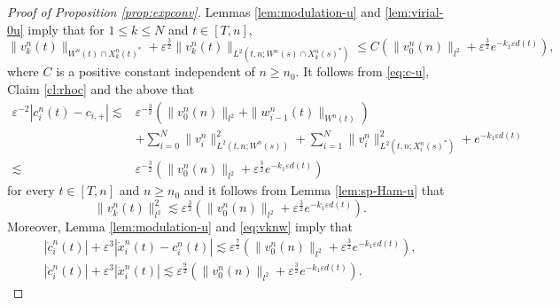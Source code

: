 \documentclass[11pt]{amsart}
\theoremstyle{remark}
\numberwithin{equation}{section}
\begin{document}
\begin{proof}[Proof of Proposition \ref{prop:expconv}]
Lemmas \ref{lem:modulation-u} and \ref{lem:virial-0u} imply that
for $1\le k\le N$ and $t\in[T,n]$,
\begin{equation}
\label{eq:vknw}
\|v_k^n(t)\|_{W^n(t)\cap X_k^n(t)^*}
+{\varepsilon}^{\frac32}\|v_k^n(t)\|_{L^2(t,n;W^n(s)\cap X_k^n(s)^*)}
\le C(\|v_0^n(n)\|_{l^2}+{\varepsilon}^{\frac32}e^{-k_1{\varepsilon} d(t)}),
\end{equation}
where $C$ is a positive constant independent of $n\ge n_0$.
It follows from \eqref{eq:c-u}, Claim \ref{cl:rhoc} and the above that
\begin{equation}
  \label{eq:cinb}
  \begin{split}
{\varepsilon}^{-2}|c_i^n(t)-c_{i,+}|\lesssim &
{\varepsilon}^{-\frac32}(\|v_0^n(n)\|_{l^2}+\|w_{i-1}^n(t)\|_{W^n(t)})
\\ & +\sum_{i=0}^N\|v_i^n\|_{L^2(t,n;W^n(s))}^2
+\sum_{i=1}^N\|v_i^n\|_{L^2(t,n;X_i^n(s)^*)}^2+e^{-k_1{\varepsilon} d(t)}
\\ \lesssim & {\varepsilon}^{-\frac32}(\|v_0^n(n)\|_{l^2}+{\varepsilon}^{\frac32}e^{-k_1{\varepsilon} d(t)})  
  \end{split}
\end{equation}
for every $t\in[T,n]$ and $n\ge n_0$ and it follows from
Lemma \ref{lem:sp-Ham-u} that
\begin{equation}
  \label{eq:vknb}
\|v_k^n(t)\|_{l^2}^2\lesssim  {\varepsilon}^{\frac32}
(\|v_0^n(n)\|_{l^2}+{\varepsilon}^{\frac32}e^{-k_1{\varepsilon} d(t)}).
\end{equation}
Moreover, Lemma \ref{lem:modulation-u} and \eqref{eq:vknw} imply that
\begin{gather}
\label{eq:xc-n}
|\dot{c}_i^n(t)|+{\varepsilon}^3|\dot{x}_i^n(t)-c_i^n(t)|\lesssim
{\varepsilon}^{\frac72}(\|v_0^n(n)\|_{l^2}+{\varepsilon}^{\frac32}e^{-k_1{\varepsilon} d(t)}),
\\ \label{eq:xc-n2}
|\ddot{c}_i^n(t)|+{\varepsilon}^3|\ddot{x}_i^n(t)|\lesssim
{\varepsilon}^{\frac92}(\|v_0^n(n)\|_{l^2}+{\varepsilon}^{\frac32}e^{-k_1{\varepsilon} d(t)}). 
\end{gather}
\par


\end{proof}
\end{document}
